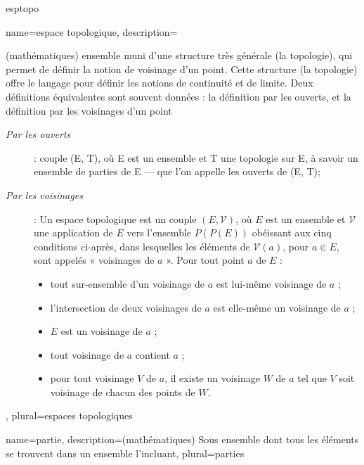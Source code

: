 


\newglossaryentry

{esptopo}
{
	name={espace topologique},
	description={(mathématiques) ensemble muni d'une structure très générale (la topologie), qui permet de définir la notion de voisinage d'un point. Cette structure (la topologie) offre le langage pour définir les notions de continuité et de limite. Deux définitions équivalentes sont souvent données : la définition par les ouverts, et la définition par les voisinages d'un point
	\begin{description}
		\item [\emph{Par les ouverts}] : couple (E, T), où E est un ensemble et T une topologie sur E, à savoir un ensemble de parties de E — que l'on appelle les ouverts de (E, T);
		\item [\emph{Par les voisinages}] : Un espace topologique est un couple $(E,\mathcal {V})$, où $E$ est un ensemble et $\mathcal {V}$ une application de $E$ vers l'ensemble $P(P(E))$ obéissant aux cinq conditions ci-après, dans lesquelles les éléments de $\mathcal {V}(a)$, pour $a \in E$, sont appelés « voisinages de $a$ ». Pour tout point $a$ de $E$ :
		\begin{itemize}
			\item tout sur-ensemble d'un voisinage de $a$ est lui-même voisinage de $a$ ;
			\item l'intersection de deux voisinages de $a$ est elle-même un voisinage de $a$ ;
			\item $E$ est un voisinage de $a$ ;
			\item tout voisinage de $a$ contient $a$ ;
			\item pour tout voisinage $V$ de $a$, il existe un voisinage $W$ de $a$ tel que $V$ soit voisinage de chacun des points de $W$.
		\end{itemize}
	\end{description}},
	plural={espaces topologiques}
}

{
	name={partie},
	description={(mathématiques) Sous ensemble dont tous les éléments se trouvent dans un ensemble l'incluant}, 
	plural={parties}
}

